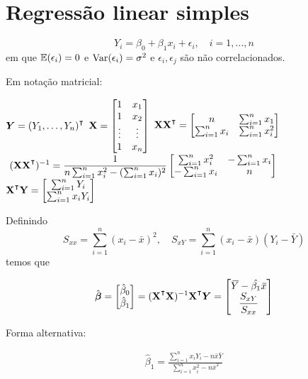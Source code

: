 \section{Regressão linear simples}


\begin{equation}
	Y_i = \beta_0 + \beta_1 x_i + \epsilon_i, \quad i=1,\ldots,n
\end{equation}
%
em que $\operatorname{\mathbb{E}}(\epsilon_i)=0$ e $\operatorname{Var}(\epsilon_i)=\sigma^2$ e $\epsilon_i, \epsilon_j$ são não correlacionados.

Em notação matricial:

\begin{outline}
	\1 $\v{Y} = (Y_1, \ldots, Y_n)\T$ 
	\1 \( \mathbf{X} = \begin{bmatrix}
		1 & x_1 \\ 1 & x_2 \\ \vdots & \vdots \\ 1 & x_n
	\end{bmatrix} \)
	\1 \(\m{X}\m{X}\T = \begin{bmatrix}
		n & \sum_{i=1}^n x_1  \\ \sum_{i=1}^n x_i & \sum_{i=1}^n x_i^2
	\end{bmatrix} \) 
	\1 \( \displaystyle \ (\m{X}\m{X}\T)\inv = \frac{1}{n\sum_{i=1}^n x_i^2 - (\sum_{i=1}^n x_i)^2} \begin{bmatrix}
		\sum_{i=1}^n x_i^2 & -\sum_{i=1}^n x_i  \\ -\sum_{i=1}^n x_i & n
	\end{bmatrix} \)
	\1 \( \m{X}\T\m{Y} = \begin{bmatrix}
	\sum_{i=1}^n Y_i  \\ \sum_{i=1}^n x_i Y_i
	\end{bmatrix} \)
\end{outline}


Definindo
\begin{equation}
	S_{xx} = \sum_{i=1}^n (x_i-\bar{x})^2, \quad S_{xY} = \sum_{i=1}^n (x_i-\bar{x})(Y_i-\bar{Y})
\end{equation}
%
temos que

\begin{equation}
	\hat{\v{\beta}} = \begin{bmatrix} 
		\hat{\beta}_0 \\ \hat{\beta}_1
	\end{bmatrix}
	= (\m{X}\T \m{X})\inv\m{X}\T\v{Y} = 
	\begin{bmatrix}
		\bar{Y} - \hat{\beta_1}\bar{x} \\ \displaystyle \frac{S_{xY}}{S_{xx}}
	\end{bmatrix}
\end{equation}

Forma alternativa:

\begin{align}
	\hat{\beta}_1 = \frac{\sum_{i=1}^n x_i Y_i - n \bar{x}\bar{Y}}{\sum_{i=1}^{n}x_i^2-n \bar{x}^2} 
\end{align}